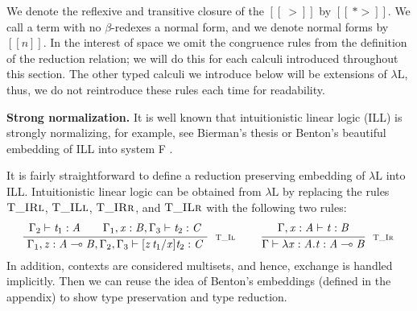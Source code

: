 \documentclass{lmcs}
\begin{document}
We denote the reflexive and transitive closure of the $[[~>]]$ by
$[[~*>]]$.  We call a term with no $\beta$-redexes a normal form,
and we denote normal forms by $[[n]]$.  In the interest of space we
omit the congruence rules from the definition of the reduction
relation; we will do this for each calculi introduced throughout this
section.  The other typed calculi we introduce below will be
extensions of $\lambda\text{L}$, thus, we do not reintroduce these
rules each time for readability.

\textbf{Strong normalization.}  It is well known that intuitionistic
linear logic (ILL) is strongly normalizing, for example, see Bierman's
thesis \cite{Bierman:1994} or Benton's beautiful embedding of ILL into
system F \cite{Benton:1995c}.  

It is fairly straightforward to define a reduction preserving
embedding of $\lambda\text{L}$ into ILL.  Intuitionistic linear logic
can be obtained from $\lambda\text{L}$ by replacing the rules
$\textsc{T\_IRl}$, $\textsc{T\_ILl}$, $\textsc{T\_IRr}$,
and $\textsc{T\_ILr}$ with the following two rules:
\[
\begin{array}{cccccccc}
  \LdruleTXXIl{} & \quad \LdruleTXXIr{}
\end{array}
\]
In addition, contexts are considered multisets, and hence, exchange is
handled implicitly. Then we can reuse the idea of Benton's embeddings
(defined in the appendix) to show type preservation and type
reduction.
\end{document}
